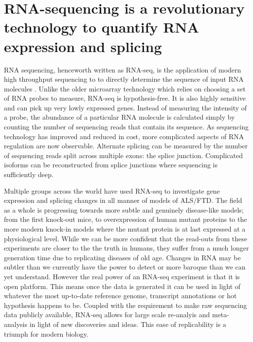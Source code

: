 

\section{RNA-sequencing is a revolutionary technology to quantify RNA expression and splicing} %

RNA sequencing, henceworth written as RNA-seq, is the application of modern high throughput sequencing to  to directly determine the sequence of input RNA molecules \citep{Wang2009}. Unlike the older microarray technology which relies on choosing a set of RNA probes to measure, RNA-seq is hypothesis-free. It is also highly sensitive and can pick up very lowly expressed genes. Instead of measuring the intensity of a probe, the abundance of a particular RNA molecule is calculated simply by counting the number of sequencing reads that contain its sequence. As sequencing technology has improved and reduced in cost, more complicated aspects of RNA regulation are now observable. Alternate splicing can be measured by the number of sequencing reads split across multiple exons: the splice junction. Complicated isoforms can be reconstructed from splice junctions where sequencing is sufficiently deep.

Multiple groups across the world have used RNA-seq to investigate gene expression and splicing changes in all manner of models of ALS/FTD. The field as a whole is progressing towards more subtle and genuinely disease-like models; from the first knock-out mice, to overexpression of human mutant proteins to the more modern knock-in models where the mutant protein is at last expressed at a physiological level. While we can be more confident that the read-outs from these experiments are closer to the the truth in humans, they suffer from a much longer generation time due to replicating diseases of old age. Changes in RNA may be subtler than we currently have the power to detect or more baroque than we can yet understand. However the real power of an RNA-seq experiment is that it is open platform. This means once the data is generated it can be used in light of whatever the most up-to-date reference genome, transcript annotations or hot hypothesis happens to be. Coupled with the requirement to make raw sequencing data publicly available, RNA-seq allows for large scale re-analyis and meta-analysis in light of new discoveries and ideas. This ease of replicability is a triumph for modern biology.

